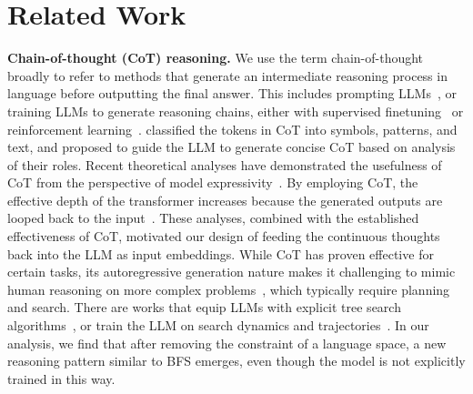 \documentclass[]{fairmeta}
\begin{document}
\section{Related Work}
\label{related_work}

\noindent\textbf{Chain-of-thought (CoT) reasoning.} We use the term chain-of-thought broadly to refer to methods that generate an intermediate reasoning process in language before outputting the final answer. This includes prompting LLMs~\citep{wei2022chain, khot2022decomposed, zhou2022least}, or training LLMs to generate reasoning chains, either with supervised finetuning~\citep{yue2023mammoth, yu2023metamath} or reinforcement learning~\citep{wang2024math, havrilla2024teaching, shao2024deepseekmath, yu2024flow}. %
\citet{madaan2022text} classified the tokens in CoT into symbols, patterns, and text, and proposed to guide the LLM to generate concise CoT based on analysis of their roles. Recent theoretical analyses have demonstrated the usefulness of CoT from the perspective of model expressivity~\citep{feng2023towards, merrill2023expresssive, li2024chain}. By employing CoT, the effective depth of the transformer increases because the generated outputs are looped back to the input~\citep{feng2023towards}. These analyses, combined with the established effectiveness of CoT, motivated our design of feeding the continuous thoughts back into the LLM as input embeddings. %
While CoT has proven effective for certain tasks, its autoregressive generation nature makes it challenging to mimic human reasoning on more complex problems~\citep{lecun2022path, hao2023reasoning}, which typically require planning and search. There are works that equip LLMs with explicit tree search algorithms~\citep{ xie2023self, yao2023tree, hao2024llm}, or train the LLM on search dynamics and trajectories~\citep{lehnert2024beyond, gandhi2024stream, su2024dualformer}. In our analysis, we find that after removing the constraint of a language space, a new reasoning pattern similar to BFS emerges, even though the model is not explicitly trained in this way.
\end{document}
